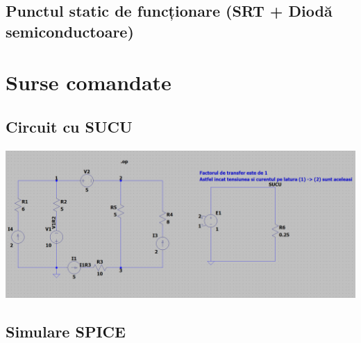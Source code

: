 \documentclass[12pt,twoside]{article}
\begin{document}
\subsection{Punctul static de funcționare (SRT + Diodă semiconductoare)}
\paragraph{}

\section{Surse comandate}
\paragraph{}

\subsection{Circuit cu SUCU}
\paragraph{}

\begin{center}
\includegraphics[scale=0.25]{SUCU_tema_elth.png}
\end{center}


\subsection{Simulare SPICE}
\end{document}
